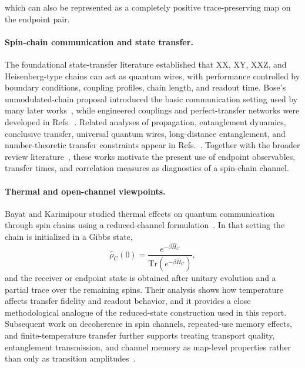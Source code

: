 \documentclass[12pt,a4paper]{article}
\newcommand{\Ham}{\hat{H}}
\newcommand{\rhohat}{\hat{\rho}}
\renewcommand{\Tr}{\mathrm{Tr}}
\begin{document}
which can also be represented as a completely positive trace-preserving map on
the endpoint pair.

\paragraph{Spin-chain communication and state transfer.}
The foundational state-transfer literature established that XX, XY, XXZ, and
Heisenberg-type chains can act as quantum wires, with performance controlled by
boundary conditions, coupling profiles, chain length, and readout time.  Bose's
unmodulated-chain proposal introduced the basic communication setting used by
many later works~\cite{bose2003}, while engineered couplings and perfect-transfer
networks were developed in Refs.~\cite{christandl2004prl,christandl2005pra}.
Related analyses of propagation, entanglement dynamics, conclusive transfer,
universal quantum wires, long-distance entanglement, and number-theoretic
transfer constraints appear in
Refs.~\cite{osborne2004,subrahmanyam2004,burgarth2005,wojcik2005,venuti2006,godsil2012}.
Together with the broader review literature~\cite{bose2007review}, these works
motivate the present use of endpoint observables, transfer times, and
correlation measures as diagnostics of a spin-chain channel.

\paragraph{Thermal and open-channel viewpoints.}
Bayat and Karimipour studied thermal effects on quantum communication through
spin chains using a reduced-channel formulation~\cite{Bayat2005}.  In that
setting the chain is initialized in a Gibbs state,
\begin{equation}
  \rhohat_C(0)=\frac{e^{-\beta\Ham_C}}{\Tr(e^{-\beta\Ham_C})},
  \label{app:gibbs_context}
\end{equation}
and the receiver or endpoint state is obtained after unitary evolution and a
partial trace over the remaining spins.  Their analysis shows how temperature
affects transfer fidelity and readout behavior, and it provides a close
methodological analogue of the reduced-state construction used in this report.
Subsequent work on decoherence in spin channels, repeated-use memory effects,
and finite-temperature transfer further supports treating transport quality,
entanglement transmission, and channel memory as map-level properties rather
than only as transition amplitudes~\cite{cai2006decoherence,bayat2008memory,qin2013thermal}.
\end{document}
